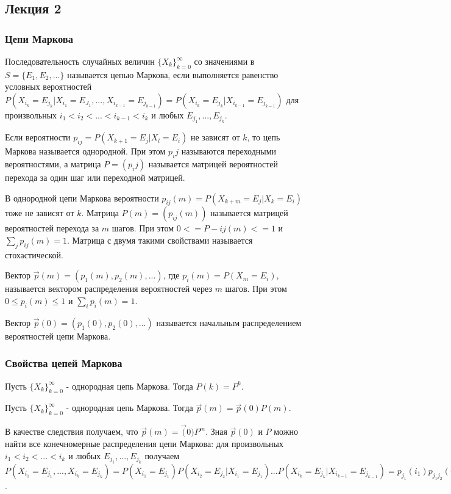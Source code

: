 
\subsection{Лекция 2}

\subsubsection*{Цепи Маркова}

Последовательность случайных величин $\{X_k\}_{k=0}^\infty$ со значениями в $S=\{E_1,E_2,...\}$ называется цепью Маркова, если выполняется равенство условных вероятностей $P(X_{i_k}=E_{j_k} | X_{i_1}=E_{J_1},...,X_{i_{k-1}}=E_{j_{k-1}}) = P(X_{i_{k}}=E_{j_{k}} | X_{i_{k-1}}=E_{j_{k-1}})$ для произвольных $i_1<i_2<...<i_{k-1}<i_k$ и любых $E_{j_{1}},...,E_{j_{k}}$.

Если вероятности $p_{ij}=P(X_{k+1}=E_j | X_l = E_i)$ не зависят от $k$, то цепь Маркова называется однородной. При этом $p_ij$ называются переходными вероятностями, а матрица $P=(p_ij)$ называется матрицей вероятностей перехода за один шаг или переходной матрицей.

В однородной цепи Маркова вероятности $p_{ij}(m)=P(X_{k+m}=E_j | X_k = E_i)$ тоже не зависят от $k$. Матрица $P(m)=(p_{ij}(m))$ называется матрицей вероятностей перехода за $m$ шагов. При этом $0<=P-{ij}(m)<=1$ и $\sum_j p_{ij}(m)=1$. Матрица с двумя такими свойствами называется стохастической.

Вектор $\vec p (m)=(p_1(m), p_2(m), ...)$, где $p_i(m)=P(X_m=E_i)$, называется вектором распределения вероятностей через $m$ шагов. При этом $0\leq p_i(m)\leq 1$ и $\sum_i p_i(m) = 1$.

Вектор $\vec p (0)=(p_1(0),p_2(0),...)$ называется начальным распределением вероятностей цепи Маркова.

\subsubsection*{Свойства цепей Маркова}

Пусть $\{X_k\}_{k=0}^\infty $ - однородная цепь Маркова. Тогда $P(k)=P^k$.

Пусть $\{X_k\}_{k=0}^\infty$ - однородная цепь Маркова. Тогда $\vec p(m)= \vec p (0) P(m)$.

В качестве следствия получаем, что $\vec p(m)=\vec (0)P^m$.
Зная $\vec p(0)$ и $P$ можно найти все конечномерные распределения цепи Маркова: для произвольных $i_1<i_2<...<i_k$ и любых $E_{j_1},...,E_{j_k}$ получаем $P(X_{i_1}=E_{j_1},...,X_{i_k}=E_{j_k}) = P(X_{i_1}=E_{j_1})P(X_{i_2}=E_{j_2}|X_{i_1}=E_{j_1})...P(X_{i_k}=E_{j_k}|X_{i_{k-1}}=E_{j_{k-1}}) = p_{j_1}(i_1)p_{j_1j_2}(i_2-i_1)...p_{j_{k-1}j_k}(i_k-i_{k-1})$.

